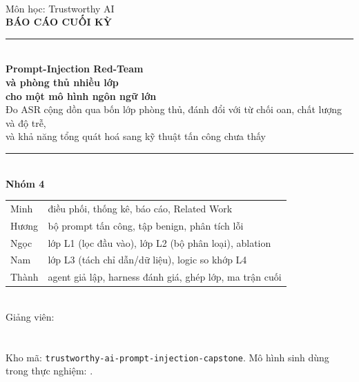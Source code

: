\begin{titlepage}
\thispagestyle{empty}
\centering
\vspace*{0.6cm}
{\sffamily\large \truong}\\[3pt]
{\sffamily\large Môn học: Trustworthy AI}\\[1.2cm]
{\sffamily\bfseries\Large BÁO CÁO CUỐI KỲ}\\[0.9cm]
\rule{0.85\linewidth}{0.8pt}\\[0.5cm]
{\sffamily\bfseries\LARGE Prompt-Injection Red-Team\\[4pt] và phòng thủ nhiều lớp\\[4pt] cho một mô hình ngôn ngữ lớn}\\[0.5cm]
{\sffamily\large Đo ASR cộng dồn qua bốn lớp phòng thủ, đánh đổi với từ chối oan, chất lượng và độ trễ,\\ và khả năng tổng quát hoá sang kỹ thuật tấn công chưa thấy}\\[0.5cm]
\rule{0.85\linewidth}{0.8pt}\\[1.1cm]

{\sffamily\bfseries\large Nhóm 4}\\[6pt]
\begin{tabular}{@{}ll@{}}
Minh  & điều phối, thống kê, báo cáo, Related Work\\
Hương & bộ prompt tấn công, tập benign, phân tích lỗi\\
Ngọc  & lớp L1 (lọc đầu vào), lớp L2 (bộ phân loại), ablation\\
Nam   & lớp L3 (tách chỉ dẫn/dữ liệu), logic so khớp L4\\
Thành & agent giả lập, harness đánh giá, ghép lớp, ma trận cuối\\
\end{tabular}\\[1.0cm]
{\sffamily Giảng viên: \giangvien}\\[0.3cm]
{\sffamily \ngaynop}\\[1.2cm]

\\[0.8cm]
{\footnotesize Kho mã: \texttt{trustworthy-ai-prompt-injection-capstone}. Mô hình sinh dùng trong thực nghiệm: \modelname.}
\end{titlepage}
